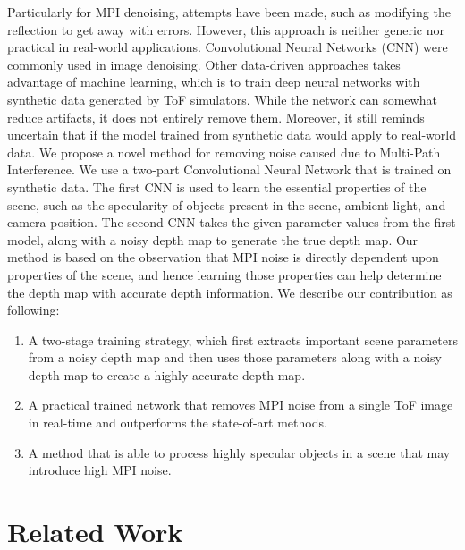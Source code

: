 \documentclass[runningheads]{llncs}
\begin{document}
Particularly for MPI denoising, attempts have been made, such as modifying the reflection to get away with errors. 
However, this approach is neither generic nor practical in real-world applications. 
Convolutional Neural Networks (CNN) were commonly used in image denoising. 
Other data-driven approaches \cite{bolsee2018cnn,marco2017deeptof} takes advantage of machine learning, which is to train deep neural networks with synthetic data generated by ToF simulators. 
While the network can somewhat reduce artifacts, it does not entirely remove them. 
Moreover, it still reminds uncertain that if the model trained from synthetic data would apply to real-world data. 
\newline
\newline
We propose a novel method for removing noise caused due to Multi-Path Interference. 
We use a two-part Convolutional Neural Network that is trained on synthetic data. 
The first CNN is used to learn the essential properties of the scene, such as the specularity of objects present in the scene, ambient light, and camera position. 
The second CNN takes the given parameter values from the first model, along with a noisy depth map to generate the true depth map.
Our method is based on the observation that MPI noise is directly dependent upon properties of the scene, and hence learning those properties can help determine the depth map with accurate depth information.
\newline
\newline
We describe our contribution as following: 
\begin{enumerate}
    \item A two-stage training strategy, which first extracts important scene parameters from a noisy depth map and then uses those parameters along with a noisy depth map to create a highly-accurate depth map.  
    \item A practical trained network that removes MPI noise from a single ToF image in real-time and outperforms the state-of-art methods.
    \item A method that is able to process highly specular objects in a scene that may introduce high MPI noise.
\end{enumerate}



\section{Related Work}
\end{document}
